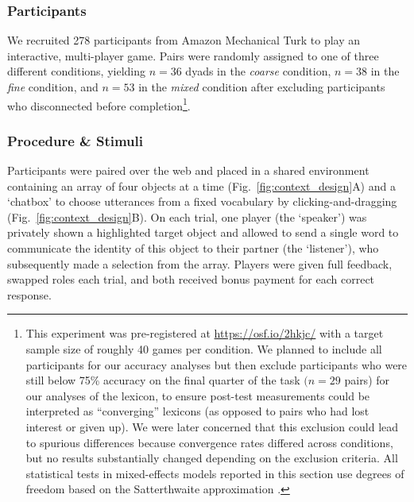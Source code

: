 \subsubsection{Participants}

We recruited 278 participants from Amazon Mechanical Turk to play an interactive, multi-player game. Pairs were randomly assigned to one of three different conditions, yielding $n=36$ dyads in the \emph{coarse} condition, $n=38$ in the \emph{fine} condition, and $n=53$ in the \emph{mixed} condition after excluding participants who disconnected before completion\footnote{This experiment was pre-registered at \url{https://osf.io/2hkjc/} with a target sample size of roughly 40 games per condition. We planned to include all participants for our accuracy analyses but then exclude participants who were still below 75\% accuracy on the final quarter of the task $(n=29$ pairs) for our analyses of the lexicon, to ensure post-test measurements could be interpreted as ``converging'' lexicons (as opposed to pairs who had lost interest or given up). We were later concerned that this exclusion could lead to spurious differences because convergence rates differed across conditions, but no results substantially changed depending on the exclusion criteria. All statistical tests in mixed-effects models reported in this section use degrees of freedom based on the Satterthwaite approximation \cite{luke2017evaluating}.}.

\subsubsection{Procedure \& Stimuli}
Participants were paired over the web and placed in a shared environment containing an array of four objects at a time (Fig.~\ref{fig:context_design}A) and a `chatbox' to choose utterances from a fixed vocabulary by clicking-and-dragging (Fig.~\ref{fig:context_design}B). On each trial, one player (the `speaker') was privately shown a highlighted target object and allowed to send a single word to communicate the identity of this object to their partner (the `listener'), who subsequently made a selection from the array. Players were given full feedback, swapped roles each trial, and both received bonus payment for each correct response.

